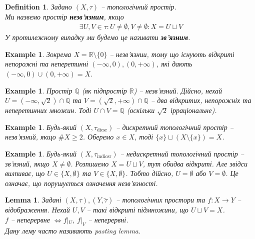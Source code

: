 \documentclass[a4paper, 10pt]{article}
\theoremstyle{theoremdd}
\newtheorem{definition}[theorem]{Definition}
\newtheorem{example}[theorem]{Example}
\newtheorem{lemma}[theorem]{Lemma}
\begin{document}
\begin{definition}
Задано $(X,\tau)$ -- топологічний простір.\\
Ми назвемо простір \textbf{незв'язним}, якщо
\begin{align*}
\exists U,V \in \tau: U \neq \emptyset, V \neq \emptyset: X = U \sqcup V
\end{align*}
У протилежному випадку ми будемо це називати \textbf{зв'язним}.
\end{definition}

\begin{example}
Зокрема $X = \mathbb{R} \setminus \{0\}$ -- незв'язнии, тому що існують відкриті непорожні та неперетинні $(-\infty,0), (0,+\infty)$, які дають $(-\infty,0) \cup (0,+\infty) = X$.
\end{example}

\begin{example}
Простір $\mathbb{Q}$ (як підпростір $\mathbb{R}$) -- незв'язний. Дійсно, нехай $U = (-\infty,\sqrt{2}) \cap \mathbb{Q}$ та $V = (\sqrt{2},+\infty) \cap \mathbb{Q}$ -- два відкритих, непорожніх та неперетинних множин. Тоді $U \cap V = \mathbb{Q}$ (оскільки $\sqrt{2}$ ірраціональне).
\end{example}

\begin{example}
Будь-який $(X,\tau_{\text{dicsr}})$ -- дискретний топологічний простір -- незв'язний, якщо $\# X \geq 2$. Оберемо $x \in X$, тоді $\{x\} \sqcup (X \setminus \{x\}) = X$.
\end{example}

\begin{example}
Будь-який $(X,\tau_{\text{indicsr}})$ -- недискретний топологічний простір -- зв'язний, якщо $X \neq \emptyset$. Розпишемо $X = U \sqcup V$, тут обидва відкриті. Але звідси вилпиває, що $U \in \{X, \emptyset\}$ та $V \in \{X,\emptyset\}$. Тобто дійсно, $U = \emptyset$ або $V = \emptyset$. Це означає, що порушується означення незв'язності.
\end{example}

\begin{lemma}
Задані $(X,\tau), (Y,\tilde{\tau})$ -- топологічних простори та $f \colon X \to Y$ -- відображення. Нехай $U,V$ -- такі відкриті підмножини, що $U \sqcup V = X$.\\
$f$ -- неперервне $\iff f|_U,\ f|_V$ -- неперервні.\\
\textit{Дану лему часто називають pasting lemma}.
\end{lemma}
\end{document}
